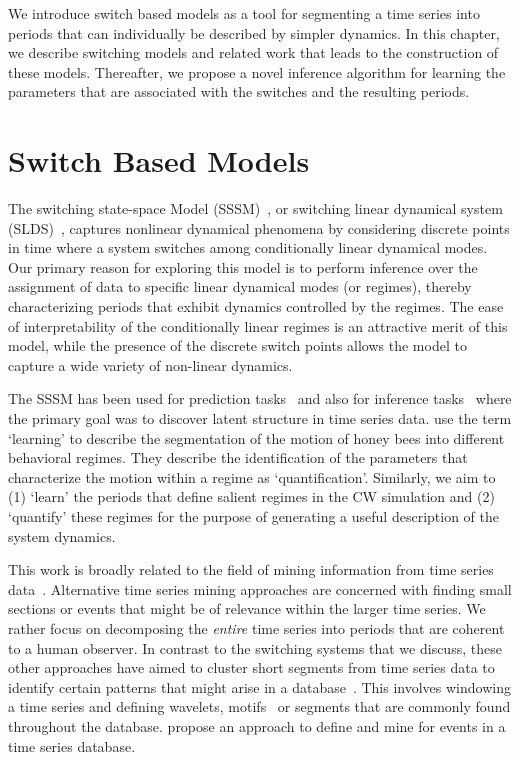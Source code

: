 We introduce switch based models as a tool for segmenting a time series into periods that can individually be described by simpler dynamics. In this chapter, we describe switching models and related work that leads to the construction of these models. Thereafter, we propose a novel inference algorithm for learning the parameters that are associated with the switches and the resulting periods.

\section{Switch Based Models}
The switching state-space Model (SSSM)~\citep{ghahramani2000variational}, or switching linear dynamical system (SLDS)~\citep{fox2009nonparametric}, captures nonlinear dynamical phenomena by considering discrete points in time where a system switches among conditionally linear dynamical modes. Our primary reason for exploring this model is to perform inference over the assignment of data to specific linear dynamical modes (or regimes), thereby characterizing periods that exhibit dynamics controlled by the regimes. The ease of interpretability of the conditionally linear regimes is an attractive merit of this model, while the presence of the discrete switch points allows the model to capture a wide variety of non-linear dynamics.

The SSSM has been used for prediction tasks~\citep{fox2007hierarchical,li2003survey} and also for inference tasks~\citep{fox2009nonparametric,jonsen2007identifying,pavlovic2001learning} where the primary goal was to discover latent structure in time series data. \citet{oh2008learning} use the term `learning' to describe the segmentation of the motion of honey bees into different behavioral regimes. They describe the identification of the parameters that characterize the motion within a regime as `quantification'. Similarly, we aim to (1) `learn' the periods that define salient regimes in the CW simulation and (2) `quantify' these regimes for the purpose of generating a useful description of the system dynamics.

This work is broadly related to the field of mining information from time series data~\citep{esling2012time,horst2004data}. Alternative time series mining approaches are concerned with finding small sections or events that might be of relevance within the larger time series. We rather focus on decomposing the \textit{entire} time series into periods that are coherent to a human observer. In contrast to the switching systems that we discuss, these other approaches have aimed to cluster short segments from time series data to identify certain patterns that might arise in a database~\citep{vlachos2003wavelet,tanaka2005discovery,patel2002mining}. This involves windowing a time series and defining wavelets, motifs~\citep{patel2002mining} or segments that are commonly found throughout the database. \cite{preston2009event} propose an approach to define and mine for events in a time series database.

